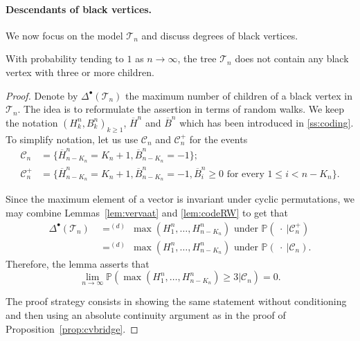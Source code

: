 \documentclass[10pt]{amsart}
\theoremstyle{definition}\newtheorem{defi}[theo]{Definition}\newtheorem{rema}[theo]{Remark}\newtheorem{exam}[theo]{Example}\newtheorem{exem}[theo]{Example}\newtheorem{nota}[theo]{Notation}
\def\oB{\overline{B}}
\def\oH{\overline{H}}
\def\Ts{\mathscr{T}}
\renewcommand\Pr[1]{\mathbb{P}\left(#1\right)}
\begin{document}
\paragraph*{Descendants of black vertices.}
We now focus on the model $\Ts_n$ and discuss degrees of black vertices.


\begin{lemma}
  With probability tending to $1$ as $n \rightarrow \infty$, the tree $\Ts_{n}$ does not contain any black vertex with three or more children.
  \label{lem:AtMost2}
\end{lemma}

\begin{proof}
Denote by $\Delta^{\bullet}(\Ts_{n})$ the maximum number of children of a black vertex in $\Ts_{n}$.
The idea is to reformulate the assertion in terms of random walks.
We keep the notation  $(H^{n}_k,B^n_k)_{k \geq 1}$, $\overline{H}^{n}$ and $\overline{B}^{n}$ which has been introduced in \cref{ss:coding}.
To simplify notation, let us use $ \mathcal{C}_n$ and  $ \mathcal{C}^+_{n}$ for the events
\begin{align*}
  \mathcal{C}_{n}&= \{\oH^{n}_{n-K_{n}}=K_{n}+1,\oB^{n}_{n-K_{n}}=-1\};  \\
  \mathcal{C}^+_{n}&= \{\oH^{n}_{n-K_{n}}=K_{n}+1,\oB^{n}_{n-K_{n}}=-1, \oB^{n}_{i} \geq 0 \textrm{ for every } 1 \leq i <n-K_{n}\}.
\end{align*}

Since the maximum element of a vector is invariant under cyclic permutations, we may combine  Lemmas~\ref{lem:vervaat} and \ref{lem:codeRW} to get that
\begin{align*}
  \Delta^{\bullet}(\Ts_{n}) \ & \mathop{=}^{(d)} \  \max(H^{n}_{1}, \ldots, H^{n}_{n-K_{n}}) \textrm{ under } \Pr{\ \cdot  \ \big|  \mathcal{C}^+_{n} } \\
  & \mathop{=}^{(d)} \  \max(H^{n}_{1}, \ldots, H^{n}_{n-K_{n}}) \textrm{ under } \Pr{\ \cdot  \ \big|  \mathcal{C}_{n} }.
\end{align*}
Therefore, the lemma asserts that
\[\lim_{n \to \infty} \Pr{\max(H^{n}_{1}, \ldots, H^{n}_{n-K_{n}}) \geq 3 \big|  \mathcal{C}_{n} } = 0.\]

The proof strategy consists in showing the same statement without conditioning
and then using an absolute continuity argument as in the proof of Proposition~\ref{prop:cvbridge}.


\end{proof}
\end{document}
